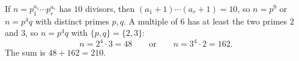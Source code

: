 If $n=p_1^{a_1}\cdots p_r^{a_r}$ has $10$ divisors, then $(a_1+1)\cdots(a_r+1)=10$, so $n=p^9$ or $n=p^4q$ with distinct primes $p,q$. A multiple of $6$ has at least the two primes $2$ and $3$, so $n=p^4q$ with $\{p,q\}=\{2,3\}$:
\[
n=2^4\cdot3=48\qquad\text{or}\qquad n=3^4\cdot2=162 .
\]
The sum is $48+162=\boxed{210}$.
